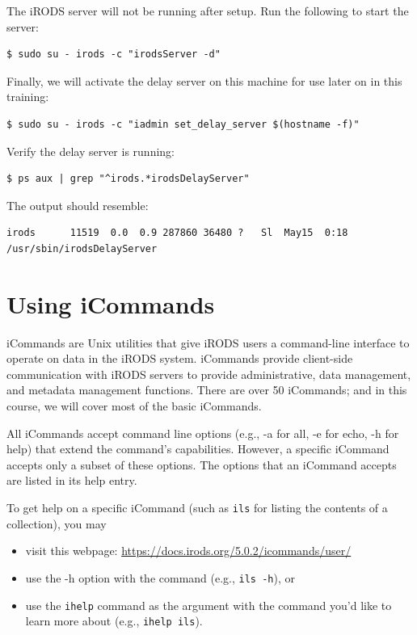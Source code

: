 \documentclass[10pt,oneside]{memoir}
\begin{document}
The iRODS server will not be running after setup. Run the following to start the server:
\begin{lstlisting}
$ sudo su - irods -c "irodsServer -d"
\end{lstlisting}

Finally, we will activate the delay server on this machine for use later on in this training:
\begin{lstlisting}
$ sudo su - irods -c "iadmin set_delay_server $(hostname -f)"
\end{lstlisting}

Verify the delay server is running:
\begin{lstlisting}
$ ps aux | grep "^irods.*irodsDelayServer"
\end{lstlisting}

The output should resemble:
\begin{lstlisting}
irods      11519  0.0  0.9 287860 36480 ?   Sl  May15  0:18 /usr/sbin/irodsDelayServer
\end{lstlisting}

\chapter{Using iCommands}

iCommands are Unix utilities that give iRODS users a command-line interface to operate on data in the iRODS system. iCommands provide client-side communication with iRODS servers to provide administrative, data management, and metadata management functions. There are over 50 iCommands; and in this course, we will cover most of the basic iCommands.

All iCommands accept command line options (e.g., -a for all, -e for echo, -h for help) that extend the command's capabilities. However, a specific iCommand accepts only a subset of these options. The options that an iCommand accepts are listed in its help entry.

To get help on a specific iCommand (such as \texttt{ils} for listing the contents of a collection), you may
\begin{itemize}
 \item visit this webpage: \url{https://docs.irods.org/5.0.2/icommands/user/}
 \item use the -h option with the command (e.g., \texttt{ils -h}), or
 \item use the \texttt{ihelp} command as the argument with the command you'd like to learn more
         about (e.g., \texttt{ihelp ils}).
\end{itemize}
\end{document}
